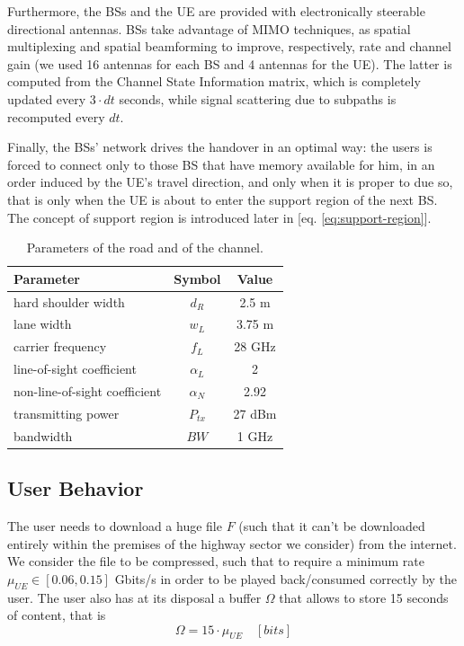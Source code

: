 \documentclass[conference,10pt]{IEEEtran}
\begin{document}
Furthermore, the BSs and the UE are provided with electronically steerable directional antennas. BSs take advantage of MIMO techniques, as spatial multiplexing and spatial beamforming to improve, respectively, rate and channel gain (we used 16 antennas for each BS and 4 antennas for the UE). The latter is computed from the Channel State Information matrix, which is completely updated every $3\cdot dt$ seconds, while signal scattering due to subpaths is recomputed every $dt$.

Finally, the BSs' network drives the handover in an optimal way: the users is forced to connect only to those BS that have memory available for him, in an order induced by the UE's travel direction, and only when it is proper to due so, that is only when the UE is about to enter the support region of the next BS. The concept of support region is introduced later in [eq. \ref{eq:support-region}].

\begin{center}
	\begin{table}
		\caption{Parameters of the road and of the channel.}
		\label{tab:params}
		\begin{center}
			\begin{tabular}{lcc}
				\toprule
				Parameter	&	Symbol	&	Value	\\
				\midrule
				hard shoulder width				&	$d_R$		&	2.5 m	\\
				lane width						&	$w_L$		&	3.75 m	\\
				carrier frequency				&	$f_L$		&	28 GHz	\\
				line-of-sight coefficient		&	$\alpha_L$	&	2		\\
				non-line-of-sight coefficient	&	$\alpha_N$	&	2.92	\\
				transmitting power				&	$P_{tx}$	&	27 dBm	\\
				bandwidth						&	$BW$		&	1 GHz   \\
				\bottomrule
			\end{tabular}
		\end{center}
	\end{table}
\end{center}

\subsection{User Behavior}

The user needs to download a huge file $F$ (such that it can't be downloaded entirely within the premises of the highway sector we consider) from the internet. We consider the file to be compressed, such that to require a minimum rate $\mu_{U\!E} \in [0.06, 0.15]$ Gbits/s in order to be played back/consumed correctly by the user. The user also has at its disposal a buffer $\Omega$ that allows to store 15 seconds of content, that is
\begin{equation}
\Omega = 15 \cdot \mu_{U\!E} \quad [bits]
\end{equation}
\end{document}

